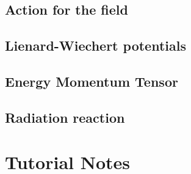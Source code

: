    \chapter{Action for the field}
      
      
      
      
      
      

   \chapter{Lienard-Wiechert potentials}
      
      
      
      
      

   \chapter{Energy Momentum Tensor}
      
      
      

   \chapter{Radiation reaction}
      
      
      
      
   
\part{Tutorial Notes}
   
   
   
   
   
   
   

